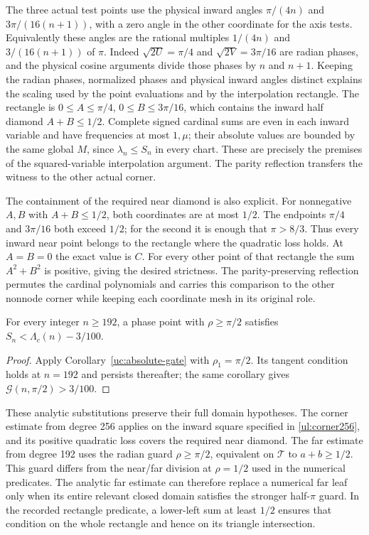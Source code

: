 The three actual test points use the physical inward angles
$\pi/(4n)$ and $3\pi/(16(n+1))$, with a zero angle in the other
coordinate for the axis tests. Equivalently these angles are the
rational multiples $1/(4n)$ and $3/(16(n+1))$ of $\pi$.
Indeed $\sqrt{2U}=\pi/4$ and $\sqrt{2V}=3\pi/16$ are radian
phases, and the physical cosine arguments divide those phases by
$n$ and $n+1$. Keeping the radian phases, normalized phases and
physical inward angles distinct explains the scaling used by the
point evaluations and by the interpolation rectangle.
The rectangle is $0\leq A\leq\pi/4$,
$0\leq B\leq3\pi/16$, which contains the inward half diamond
$A+B\leq1/2$. Complete signed cardinal sums are even in each inward
variable and have frequencies at most $1,\mu$; their absolute values are
bounded by the same global $M$, since $\lambda_n\leq S_n$ in every
chart. These are precisely the premises of the squared-variable
interpolation argument. The parity reflection transfers the witness to
the other actual corner.

The containment of the required near diamond is also explicit.
For nonnegative $A,B$ with $A+B\leq1/2$, both coordinates are at
most $1/2$. The endpoints $\pi/4$ and $3\pi/16$ both exceed
$1/2$; for the second it is enough that $\pi>8/3$.
Thus every inward near point belongs to the rectangle where the
quadratic loss holds. At $A=B=0$ the exact value is $C$.
For every other point of that rectangle the sum $A^2+B^2$ is
positive, giving the desired strictness. The parity-preserving
reflection permutes the cardinal polynomials and carries this
comparison to the other nonnode corner while keeping each coordinate
mesh in its original role.

\begin{corollary}\label{ul:far192}
For every integer $n\geq192$, a phase point with $\rho\geq\pi/2$
satisfies $S_n<\Lambda_c(n)-3/100$.
\end{corollary}
\begin{proof}
Apply Corollary~\ref{uc:absolute-gate} with $\rho_1=\pi/2$.
Its tangent condition holds at $n=192$ and persists thereafter;
the same corollary gives $\mathcal G(n,\pi/2)>3/100$.
\end{proof}

These analytic substitutions preserve their full domain hypotheses.
The corner estimate from degree 256 applies on the inward square
specified in \eqref{ul:corner256}, and its positive quadratic loss
covers the required near diamond. The far estimate from degree 192
uses the radian guard $\rho\geq\pi/2$, equivalent on
$\mathcal T$ to $a+b\geq1/2$. This guard differs from the
near/far division at $\rho=1/2$ used in the numerical predicates.
The analytic far estimate can therefore replace a numerical far
leaf only when its entire relevant closed domain satisfies the
stronger half-$\pi$ guard. In the recorded rectangle predicate, a
lower-left sum at least $1/2$ ensures that condition on the whole
rectangle and hence on its triangle intersection.

